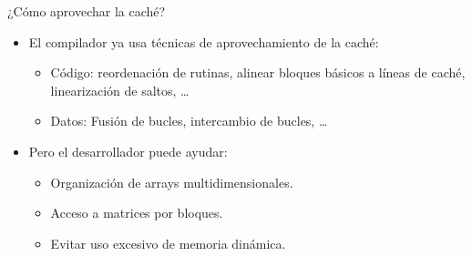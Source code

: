 \begin{frame}[t]{¿Cómo aprovechar la caché?}
\begin{itemize}
  \item El compilador ya usa técnicas de aprovechamiento de la caché:
    \begin{itemize}
      \item Código: reordenación de rutinas, alinear bloques básicos a líneas de caché, linearización de saltos, \ldots
      \item Datos: Fusión de bucles, intercambio de bucles, \ldots
    \end{itemize}
  \vfill
  \item Pero el desarrollador puede ayudar:
    \begin{itemize}
      \item Organización de arrays multidimensionales.
      \item Acceso a matrices por bloques.
      \item Evitar uso excesivo de memoria dinámica.
    \end{itemize}
\end{itemize}
\end{frame}
